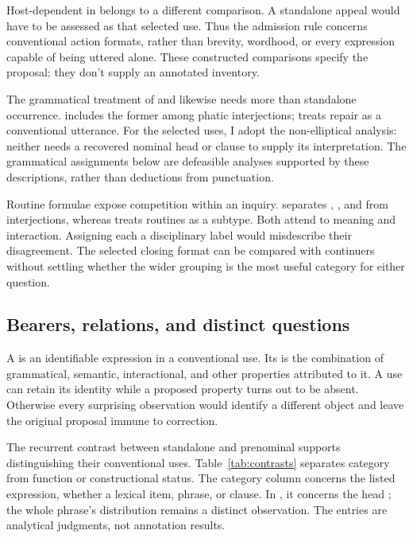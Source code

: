 \documentclass[12pt]{article}
\begin{document}
Host-dependent  in  belongs to
a different comparison. A standalone appeal  would have
to be assessed as that selected use. Thus the admission rule concerns
conventional action formats, rather than brevity, wordhood, or every
expression capable of being uttered alone. These constructed comparisons
specify the proposal; they don't supply an annotated inventory.

The grammatical treatment of  and  likewise
needs more than standalone occurrence. \textcite[114]{ameka1992} includes the former among
phatic interjections; \textcite[152]{wilkins1992} treats repair 
as a conventional utterance.
For the selected uses, I adopt the non-elliptical analysis: neither needs
a recovered nominal head or clause to supply its interpretation.
The grammatical assignments below are defeasible analyses supported by
these descriptions, rather than deductions from punctuation.

Routine formulae expose competition within an inquiry.
\textcite[108--110]{ameka1992} separates , ,
and  from interjections, whereas
\textcite[142]{wilkins1992} treats routines as a subtype. Both attend
to meaning and interaction. Assigning each a disciplinary label would
misdescribe their disagreement. The selected closing format can be
compared with continuers without settling whether the wider grouping
is the most useful category for either question.

\subsection{Bearers, relations, and distinct questions}

A  is an identifiable expression in a conventional use.
Its  is the combination of grammatical, semantic, interactional,
and other properties attributed to it. A use can retain its identity
while a proposed property turns out to be absent. Otherwise every
surprising observation would identify a different object and leave the
original proposal immune to correction.

The recurrent contrast between standalone and prenominal 
supports distinguishing their conventional uses. Table~\ref{tab:contrasts}
separates category from function or constructional status. The category
column concerns the listed expression, whether a lexical item, phrase,
or clause. In , it concerns the head ;
the whole phrase's distribution remains a distinct observation.
The entries are analytical judgments, not annotation results.
\end{document}
